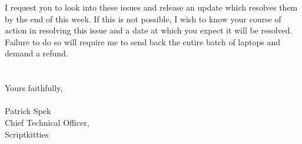 \documentclass[11pt,english]{article}
\begin{document}
  \par
  I request you to look into these issues and release an update which resolves
  them by the end of this week. If this is not possible, I wish to know your
  course of action in resolving this issue and a date at which you expect it will
  be resolved. Failure to do so will require me to send back the entire batch of
  laptops and demand a refund.
  \\
  \\
  \\
  Yours faithfully,
  \\
  \\
  Patrick Spek
  \\
  Chief Technical Officer, \\
  Scriptkitties
\end{document}
